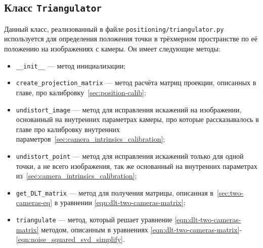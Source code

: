 \documentclass[14pt, a4paper]{extarticle}
\begin{document}
\subsection{Класс \texttt{Triangulator}}
Данный класс, реализованный в файле \texttt{positioning/triangulator.py}
используется для определения положения точки в трёхмерном пространстве по её
положению на изображениях с камеры. Он имеет следующие методы:
\begin{itemize}
  \item \texttt{\_\_init\_\_} --- метод инициализации;
  \item \texttt{create\_projection\_matrix} --- метод расчёта матриц проекции,
    описанных в главе, про калибровку~\ref{sec:position-calib};
  \item \texttt{undistort\_image} --- метод для исправления искажений на
    изображении, основанный на внутренних параметрах камеры, про которые
    рассказывалось в главе про калибровку внутренних параметров~\ref{sec:camera_intrinsics_calibration};
  \item \texttt{undistort\_point} --- метод для исправления искажений только
    для одной точки, а не всего изображения, так же основанный на внутренних
    параметрах из~\ref{sec:camera_intrinsics_calibration};
  \item \texttt{get\_DLT\_matrix} --- метод для получения матрицы, описанная
    в~\ref{sec:two-cameras-eq} в уравнении \eqref{eqn:dlt-two-cameras-matrix};
  \item \texttt{triangulate} --- метод, который решает уравнение
    \eqref{eqn:dlt-two-cameras-matrix} методом, описанным в уравнениях
    \eqref{eqn:dlt-two-cameras-matrix}-\eqref{eqn:noise_squared_svd_simplify}.
\end{itemize}
\end{document}
